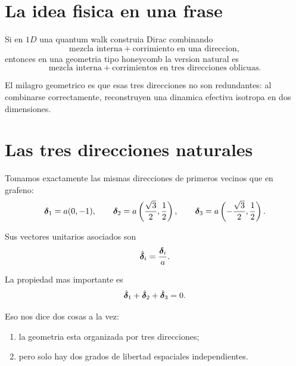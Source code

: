 \section{La idea fisica en una frase}

Si en \(1D\) una quantum walk construia Dirac combinando
\begin{equation}
\text{mezcla interna} + \text{corrimiento en una direccion},
\end{equation}
entonces en una geometria tipo honeycomb la version natural es
\begin{equation}
\text{mezcla interna} + \text{corrimientos en tres direcciones oblicuas}.
\end{equation}

El milagro geometrico es que esas tres direcciones no son redundantes: al combinarse correctamente, reconstruyen una dinamica efectiva isotropa en dos dimensiones.

\section{Las tres direcciones naturales}

Tomamos exactamente las mismas direcciones de primeros vecinos que en grafeno:
\begin{equation}
\bm{\delta}_1 = a(0,-1),
\qquad
\bm{\delta}_2 = a\left(\frac{\sqrt{3}}{2},\frac{1}{2}\right),
\qquad
\bm{\delta}_3 = a\left(-\frac{\sqrt{3}}{2},\frac{1}{2}\right).
\label{c03:eq:deltas}
\end{equation}

Sus vectores unitarios asociados son
\begin{equation}
\hat{\bm{\delta}}_i=\frac{\bm{\delta}_i}{a}.
\end{equation}

La propiedad mas importante es
\begin{equation}
\hat{\bm{\delta}}_1+\hat{\bm{\delta}}_2+\hat{\bm{\delta}}_3=0.
\label{c03:eq:sumzero}
\end{equation}

Eso nos dice dos cosas a la vez:

\begin{enumerate}[leftmargin=*]
  \item la geometria esta organizada por tres direcciones;
  \item pero solo hay dos grados de libertad espaciales independientes.
\end{enumerate}

